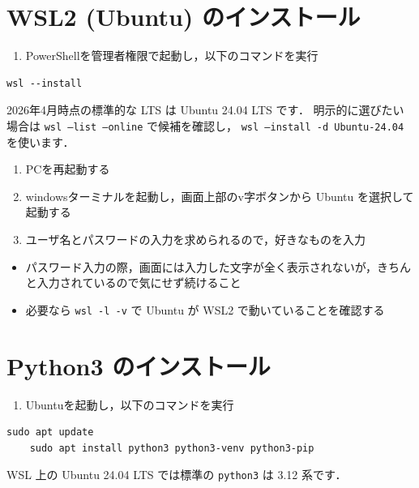 \section{WSL2 (Ubuntu) のインストール}

\begin{enumerate}
\item PowerShellを管理者権限で起動し，以下のコマンドを実行
\end{enumerate}


\begin{lstlisting}[style=codecell]
    wsl --install
\end{lstlisting}

2026年4月時点の標準的な LTS は Ubuntu 24.04 LTS です．
明示的に選びたい場合は \texttt{wsl --list --online} で候補を確認し，
\texttt{wsl --install -d Ubuntu-24.04} を使います．


\begin{enumerate}
\item PCを再起動する
\item windowsターミナルを起動し，画面上部のv字ボタンから Ubuntu を選択して起動する
\item ユーザ名とパスワードの入力を求められるので，好きなものを入力
\end{enumerate}


\begin{itemize}
\item パスワード入力の際，画面には入力した文字が全く表示されないが，きちんと入力されているので気にせず続けること
\item 必要なら \texttt{wsl -l -v} で Ubuntu が WSL2 で動いていることを確認する
\end{itemize}


\section{Python3 のインストール}

\begin{enumerate}
\item Ubuntuを起動し，以下のコマンドを実行
\end{enumerate}


\begin{lstlisting}[style=codecell]
    sudo apt update
    sudo apt install python3 python3-venv python3-pip
\end{lstlisting}

WSL 上の Ubuntu 24.04 LTS では標準の \texttt{python3} は 3.12 系です．


